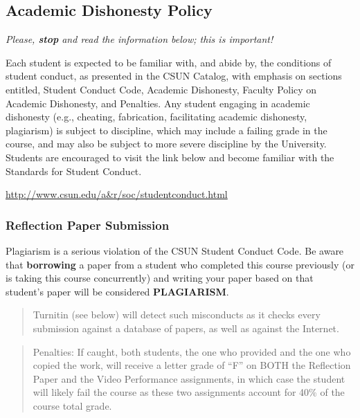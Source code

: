 \documentclass[11pt,]{article}
\begin{document}
\hypertarget{academic-dishonesty-policy}{%
\subsection{Academic Dishonesty
Policy}\label{academic-dishonesty-policy}}

\emph{Please, \textbf{stop} and read the information below; this is
important!}

Each student is expected to be familiar with, and abide by, the
conditions of student conduct, as presented in the CSUN Catalog, with
emphasis on sections entitled, Student Conduct Code, Academic
Dishonesty, Faculty Policy on Academic Dishonesty, and Penalties. Any
student engaging in academic dishonesty (e.g., cheating, fabrication,
facilitating academic dishonesty, plagiarism) is subject to discipline,
which may include a failing grade in the course, and may also be subject
to more severe discipline by the University. Students are encouraged to
visit the link below and become familiar with the Standards for Student
Conduct.

\url{http://www.csun.edu/a\&r/soc/studentconduct.html}

\hypertarget{reflection-paper-submission}{%
\subsubsection{Reflection Paper
Submission}\label{reflection-paper-submission}}

Plagiarism is a serious violation of the CSUN Student Conduct Code. Be
aware that \textbf{borrowing} a paper from a student who completed this
course previously (or is taking this course concurrently) and writing
your paper based on that student's paper will be considered
\textbf{PLAGIARISM}.

\begin{quote}
Turnitin (see below) will detect such misconducts as it checks every
submission against a database of papers, as well as against the
Internet.
\end{quote}

\begin{quote}
Penalties: If caught, both students, the one who provided and the one
who copied the work, will receive a letter grade of ``F'' on BOTH the
Reflection Paper and the Video Performance assignments, in which case
the student will likely fail the course as these two assignments account
for 40\% of the course total grade.
\end{quote}
\end{document}
